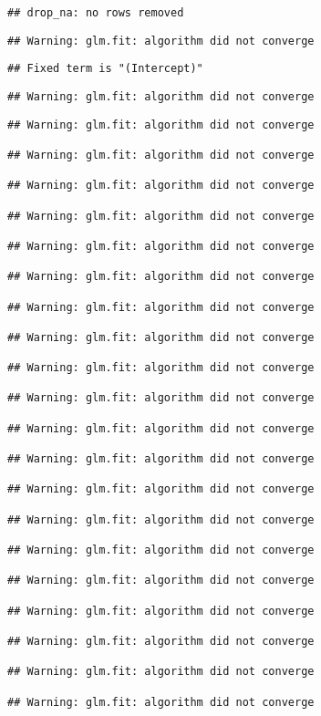 \documentclass[
]{article}
\begin{document}
\begin{verbatim}
## drop_na: no rows removed
\end{verbatim}

\begin{verbatim}
## Warning: glm.fit: algorithm did not converge
\end{verbatim}

\begin{verbatim}
## Fixed term is "(Intercept)"
\end{verbatim}

\begin{verbatim}
## Warning: glm.fit: algorithm did not converge
\end{verbatim}

\begin{verbatim}
## Warning: glm.fit: algorithm did not converge

## Warning: glm.fit: algorithm did not converge

## Warning: glm.fit: algorithm did not converge

## Warning: glm.fit: algorithm did not converge

## Warning: glm.fit: algorithm did not converge

## Warning: glm.fit: algorithm did not converge

## Warning: glm.fit: algorithm did not converge

## Warning: glm.fit: algorithm did not converge

## Warning: glm.fit: algorithm did not converge

## Warning: glm.fit: algorithm did not converge

## Warning: glm.fit: algorithm did not converge

## Warning: glm.fit: algorithm did not converge

## Warning: glm.fit: algorithm did not converge

## Warning: glm.fit: algorithm did not converge

## Warning: glm.fit: algorithm did not converge

## Warning: glm.fit: algorithm did not converge

## Warning: glm.fit: algorithm did not converge

## Warning: glm.fit: algorithm did not converge

## Warning: glm.fit: algorithm did not converge

## Warning: glm.fit: algorithm did not converge


\end{verbatim}
\end{document}
